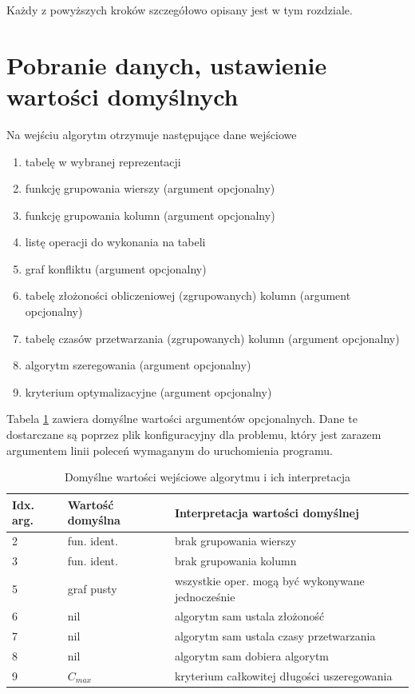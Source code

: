\documentclass[brudnopis]{xmgr}
\begin{document}
Każdy z powyższych kroków szczegółowo opisany jest w tym rozdziale.
\newpage

\section{Pobranie danych, ustawienie wartości domyślnych}

Na wejściu algorytm otrzymuje następujące dane wejściowe

\begin{enumerate}
    \item tabelę w wybranej reprezentacji
    \item funkcję grupowania wierszy (argument opcjonalny)
    \item funkcję grupowania kolumn (argument opcjonalny)
    \item listę operacji do wykonania na tabeli
    \item graf konfliktu (argument opcjonalny)
    \item tabelę złożoności obliczeniowej (zgrupowanych) kolumn (argument opcjonalny)
    \item tabelę czasów przetwarzania (zgrupowanych) kolumn (argument opcjonalny)
    \item algorytm szeregowania (argument opcjonalny)
    \item kryterium optymalizacyjne (argument opcjonalny)
\end{enumerate}

Tabela \ref{tab:args-default} zawiera domyślne wartości argumentów opcjonalnych. Dane te dostarczane są poprzez plik konfiguracyjny dla problemu, który jest zarazem argumentem linii poleceń wymaganym do uruchomienia programu.
\medskip

\begin{table}[!tbh]
\begin{tabular}{|l|l|l|} \hline
Idx. arg. & Wartość domyślna & Interpretacja wartości domyślnej \\ \hline
2 & fun. ident. & brak grupowania wierszy \\ \hline
3 & fun. ident. & brak grupowania kolumn \\ \hline
5 & graf pusty  & wszystkie oper. mogą być wykonywane jednocześnie \\ \hline
6 & nil         & algorytm sam ustala złożoność \\ \hline
7 & nil         & algorytm sam ustala czasy przetwarzania \\ \hline
8 & nil         & algorytm sam dobiera algorytm \\ \hline
9 & $C_{max}$   & kryterium całkowitej długości uszeregowania \\ \hline
\end{tabular}
\caption{Domyślne wartości wejściowe algorytmu i ich interpretacja\label{tab:args-default}}
\end{table}
\medskip
\end{document}

